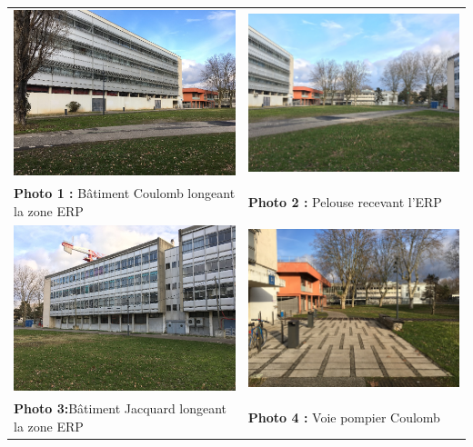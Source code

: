 \documentclass[hidelinks, paper=a4, fontsize=13pt]{report}
\begin{document}
\begin{center}
\begin{tabular}{ll}
\includegraphics[width=.45\textwidth]{Annexes/Exports/Photo_1} & \includegraphics[width=.45\textwidth]{Annexes/Exports/Photo_2} \\
\textbf{Photo 1 :} Bâtiment Coulomb longeant la zone ERP & \textbf{Photo 2 :} Pelouse recevant l'ERP
\vspace{0.2 cm}\\
\includegraphics[width=.45\textwidth]{Annexes/Exports/Photo_3} & \includegraphics[width=.45\textwidth]{Annexes/Exports/Photo_4} \\
\textbf{Photo 3:}Bâtiment Jacquard longeant la zone ERP & \textbf{Photo 4 :} Voie pompier Coulomb

\end{tabular}
\end{center}
\end{document}
